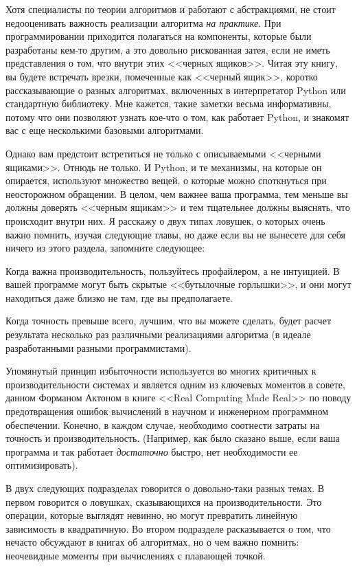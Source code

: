 Хотя специалисты по теории алгоритмов и работают с абстракциями, не стоит недооценивать важность реализации алгоритма \textit{на практике}. При программировании приходится полагаться на компоненты, которые были разработаны кем-то другим, а это довольно рискованная затея, если не иметь представления о том, что внутри этих <<черных ящиков>>. Читая эту книгу, вы будете встречать врезки, помеченные как <<черный ящик>>, коротко рассказывающие о разных алгоритмах, включенных в интерпретатор Python или стандартную библиотеку. Мне кажется, такие заметки весьма информативны, потому что они позволяют узнать кое-что о том, как работает Python, и знакомят вас с еще несколькими базовыми алгоритмами.

Однако вам предстоит встретиться не только с описываемыми <<черными ящиками>>. Отнюдь не только. И Python, и те механизмы, на которые он опирается, используют множество вещей, о которые можно споткнуться при неосторожном обращении. В целом, чем важнее ваша программа, тем меньше вы должны доверять <<черным ящикам>> и тем тщательнее должны выяснять, что происходит внутри них. Я расскажу о двух типах ловушек, о которых очень важно помнить, изучая следующие главы, но даже если вы не вынесете для себя ничего из этого раздела, запомните следующее:
\begin{itemize*}
\item Когда важна производительность, пользуйтесь профайлером, а не интуицией. В вашей программе могут быть скрытые <<бутылочные горлышки>>, и они могут находиться даже близко не там, где вы предполагаете.
\item Когда точность превыше всего, лучшим, что вы можете сделать, будет расчет результата несколько раз различными реализациями алгоритма (в идеале разработанными разными программистами).
\end{itemize*}

Упомянутый принцип избыточности используется во многих критичных к производительности системах и является одним из ключевых моментов в совете, данном Форманом Актоном в книге <<Real Computing Made Real>> по поводу предотвращения ошибок вычислений в научном и инженерном программном обеспечении. Конечно, в каждом случае, необходимо соотнести затраты на точность и производительность. (Например, как было сказано выше, если ваша программа и так работает \textit{достаточно} быстро, нет необходимости ее оптимизировать).

В двух следующих подразделах говорится о довольно-таки разных темах. В первом говорится о ловушках, сказывающихся на производительности. Это операции, которые выглядят невинно, но могут превратить линейную зависимость в квадратичную. Во втором подразделе расказывается о том, что нечасто обсуждают в книгах об алгоритмах, но о чем важно помнить: неочевидные моменты при вычислениях с плавающей точкой.

